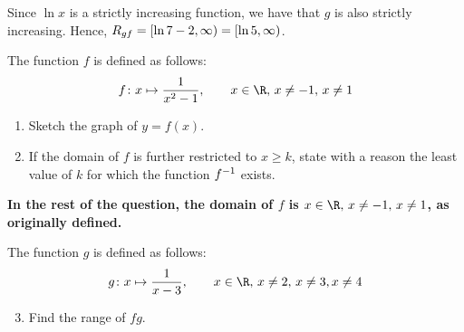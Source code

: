 \documentclass{echw}
\begin{document}
            Since $\ln x$ is a strictly increasing function, we have that $g$ is also strictly increasing. Hence, $R_{gf} = [\ln{7 - 2}, \infty) = [\ln 5, \infty)$.
            
            \boxt{$\ran{gf} = [\ln 5, \infty)$}

    \problem{}
        The function $f$ is defined as follows:
        \[
            f \colon x \mapsto \dfrac1{x^2 - 1}, \qquad x \in \R, \, x \neq -1, \, x \neq 1
        \]

        \begin{enumerate}
            \item Sketch the graph of $y = f(x)$.
            \item If the domain of $f$ is further restricted to $x \geq k$, state with a reason the least value of $k$ for which the function $f^{-1}$ exists.
        \end{enumerate}

         \textbf{In the rest of the question, the domain of $f$ is $x \in \R, \, x \neq -1, \, x \neq 1$, as originally defined.}

        \smallskip

         The function $g$ is defined as follows:
        \[
            g \colon x \mapsto \dfrac1{x-3}, \qquad x \in \R, \, x \neq 2, \, x \neq 3, x \neq 4
        \]

        \begin{enumerate}
            \setcounter{enumi}{2}
            \item Find the range of $fg$.
        \end{enumerate}
    
    \solution
\end{document}
